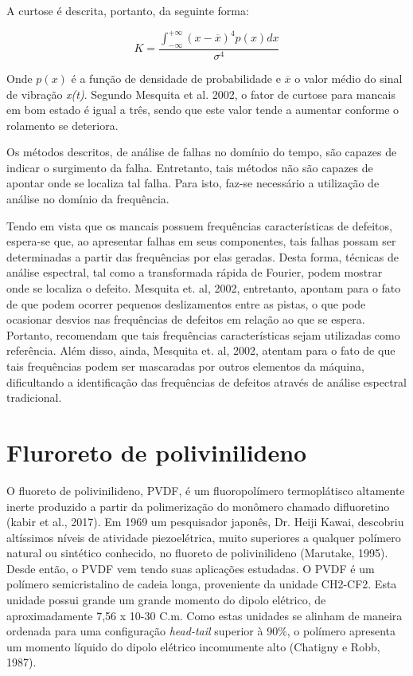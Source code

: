 \documentclass[
	12pt,				
	oneside,			
	a4paper,			
	english,			
	brazil				
	]{abntex2ppgsi}
\begin{document}
A curtose é descrita, portanto, da seguinte forma:

\[K = \frac{ \int_{-\infty}^{+\infty} (x - \overline{x})^{4}p(x)dx } {\sigma^{4}} \]

Onde $p(x)$ é a função de densidade de probabilidade e $\overline{x}$ o valor médio do sinal de vibração \textit{x(t)}. Segundo Mesquita et al. 2002, o fator de curtose para mancais em bom estado é igual a três, sendo que este valor tende a aumentar conforme o rolamento se deteriora. 

Os métodos descritos, de análise de falhas no domínio do tempo, são capazes de indicar o surgimento da falha. Entretanto, tais métodos não são capazes de apontar onde se localiza tal falha. Para isto, faz-se necessário a utilização de análise no domínio da frequência. 

Tendo em vista que os mancais possuem frequências características de defeitos, espera-se que, ao apresentar falhas em seus componentes, tais falhas possam ser determinadas a partir das frequências por elas geradas. Desta forma, técnicas de análise espectral, tal como a transformada rápida de Fourier, podem mostrar onde se localiza o defeito. Mesquita et. al, 2002, entretanto, apontam para o fato de que podem ocorrer pequenos deslizamentos entre as pistas, o que pode ocasionar desvios nas frequências de defeitos em relação ao que se espera. Portanto, recomendam que tais frequências características sejam utilizadas como referência. Além disso, ainda, Mesquita et. al, 2002, atentam para o fato de que tais frequências podem ser mascaradas por outros elementos da máquina, dificultando a identificação das frequências de defeitos através de análise espectral tradicional.

\section{\textbf{Fluroreto de polivinilideno}}

O fluoreto de polivinilideno, PVDF, é um fluoropolímero termoplátisco altamente inerte produzido a partir da polimerização do monômero chamado difluoretino (kabir et al., 2017). Em 1969 um pesquisador japonês, Dr. Heiji Kawai, descobriu altíssimos níveis de atividade piezoelétrica, muito superiores a qualquer polímero natural ou sintético conhecido, no fluoreto de polivinilideno (Marutake, 1995). Desde então, o PVDF vem tendo suas aplicações estudadas. O PVDF é um polímero semicristalino de cadeia longa, proveniente da unidade CH2-CF2. Esta unidade possui grande um grande momento do dipolo elétrico, de aproximadamente 7,56 x 10-30 C.m. Como estas unidades se alinham de maneira ordenada para uma configuração \textit{head-tail} superior à 90\%, o polímero apresenta um momento líquido do dipolo elétrico incomumente alto (Chatigny e Robb, 1987).
\end{document}
